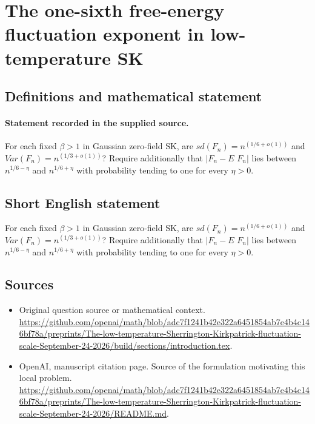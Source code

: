 \documentclass[11pt]{article}
\begin{document}
\section*{The one-sixth free-energy fluctuation exponent in low-temperature SK}\label{30007393}
\subsection{Definitions and mathematical statement}
\paragraph{Statement recorded in the supplied source.}
For each fixed $\beta >1$ in Gaussian zero-field SK, are $sd(F_n)=n^(1/6+o(1))$ and $Var(F_n)=n^(1/3+o(1))$? Require additionally that $|F_n-E$ $F_n|$ lies between $n^{1/6-\eta }$ and $n^{1/6+\eta }$ with probability tending to one for every $\eta >0$.
\subsection{Short English statement}
For each fixed $\beta >1$ in Gaussian zero-field SK, are $sd(F_n)=n^(1/6+o(1))$ and $Var(F_n)=n^(1/3+o(1))$? Require additionally that $|F_n-E$ $F_n|$ lies between $n^{1/6-\eta }$ and $n^{1/6+\eta }$ with probability tending to one for every $\eta >0$.
\subsection{Sources}
\begin{itemize}
\item[S1] Original question source or mathematical context.
\url{https://github.com/openai/math/blob/adc7f1241b42e322a6451854ab7e4b4c146bf78a/preprints/The-low-temperature-Sherrington-Kirkpatrick-fluctuation-scale-September-24-2026/build/sections/introduction.tex}.
\item[S2] OpenAI, manuscript citation page. Source of the formulation motivating this local problem.
\url{https://github.com/openai/math/blob/adc7f1241b42e322a6451854ab7e4b4c146bf78a/preprints/The-low-temperature-Sherrington-Kirkpatrick-fluctuation-scale-September-24-2026/README.md}.
\end{itemize}
\end{document}
